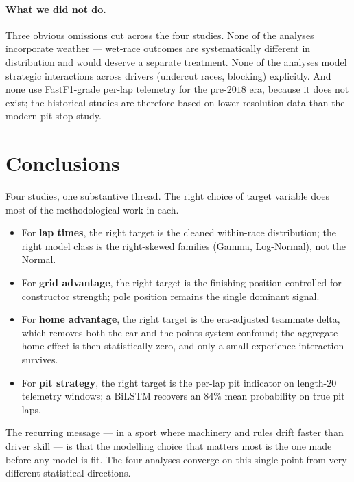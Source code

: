 \documentclass[11pt,a4paper]{article}
\theoremstyle{remark}
\begin{document}
\paragraph{What we did not do.}
Three obvious omissions cut across the four studies. None of the
analyses incorporate weather --- wet-race outcomes are systematically
different in distribution and would deserve a separate treatment.
None of the analyses model strategic interactions across drivers
(undercut races, blocking) explicitly. And none use FastF1-grade
per-lap telemetry for the pre-$2018$ era, because it does not exist;
the historical studies are therefore based on lower-resolution data
than the modern pit-stop study.

\section{Conclusions}\label{sec:concl}

Four studies, one substantive thread. The right choice of target
variable does most of the methodological work in each.
\begin{itemize}
  \item For \textbf{lap times}, the right target is the cleaned
  within-race distribution; the right model class is the right-skewed
  families (Gamma, Log-Normal), not the Normal.
  \item For \textbf{grid advantage}, the right target is the
  finishing position controlled for constructor strength; pole
  position remains the single dominant signal.
  \item For \textbf{home advantage}, the right target is the
  era-adjusted teammate delta, which removes both the car and the
  points-system confound; the aggregate home effect is then
  statistically zero, and only a small experience interaction survives.
  \item For \textbf{pit strategy}, the right target is the per-lap
  pit indicator on length-$20$ telemetry windows; a BiLSTM
  recovers an $84\%$ mean probability on true pit laps.
\end{itemize}

The recurring message --- in a sport where machinery and rules drift
faster than driver skill --- is that the modelling choice that
matters most is the one made before any model is fit. The four
analyses converge on this single point from very different
statistical directions.
\end{document}
